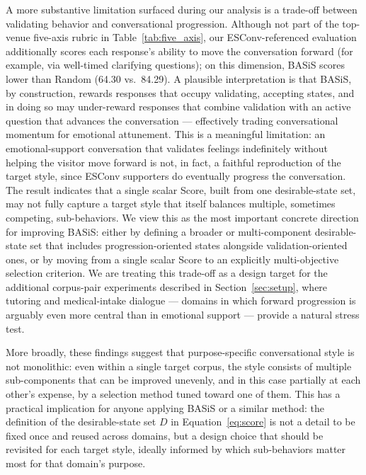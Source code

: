 \documentclass[manuscript,review,anonymous]{acmart}
\begin{document}
A more substantive limitation surfaced during our analysis is a trade-off between validating behavior and conversational progression. Although not part of the top-venue five-axis rubric in Table~\ref{tab:five_axis}, our ESConv-referenced evaluation additionally scores each response's ability to move the conversation forward (for example, via well-timed clarifying questions); on this dimension, BASiS scores lower than Random (64.30 vs.\ 84.29). A plausible interpretation is that BASiS, by construction, rewards responses that occupy validating, accepting states, and in doing so may under-reward responses that combine validation with an active question that advances the conversation --- effectively trading conversational momentum for emotional attunement. This is a meaningful limitation: an emotional-support conversation that validates feelings indefinitely without helping the visitor move forward is not, in fact, a faithful reproduction of the target style, since ESConv supporters do eventually progress the conversation. The result indicates that a single scalar Score, built from one desirable-state set, may not fully capture a target style that itself balances multiple, sometimes competing, sub-behaviors. We view this as the most important concrete direction for improving BASiS: either by defining a broader or multi-component desirable-state set that includes progression-oriented states alongside validation-oriented ones, or by moving from a single scalar Score to an explicitly multi-objective selection criterion. We are treating this trade-off as a design target for the additional corpus-pair experiments described in Section~\ref{sec:setup}, where tutoring and medical-intake dialogue --- domains in which forward progression is arguably even more central than in emotional support --- provide a natural stress test.

More broadly, these findings suggest that purpose-specific conversational style is not monolithic: even within a single target corpus, the style consists of multiple sub-components that can be improved unevenly, and in this case partially at each other's expense, by a selection method tuned toward one of them. This has a practical implication for anyone applying BASiS or a similar method: the definition of the desirable-state set $D$ in Equation~\eqref{eq:score} is not a detail to be fixed once and reused across domains, but a design choice that should be revisited for each target style, ideally informed by which sub-behaviors matter most for that domain's purpose.
\end{document}
